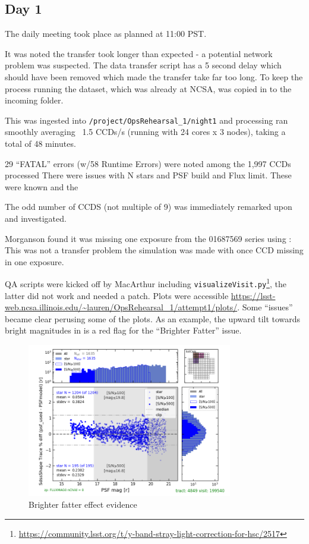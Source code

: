 \subsection{Day 1} \label{sec:day1}


The daily meeting took place as planned at 11:00 \gls{PST}.

It was noted the transfer took longer than expected - a potential network problem was suspected.
The data transfer script has a 5 second delay which should have been removed which made the transfer take far too long.
To keep the process running the dataset, which was already at \gls{NCSA}, was copied in to the incoming folder.

This was ingested into \texttt{/project/OpsRehearsal\_1/night1}  and
processing ran  smoothly  averaging  ~1.5 CCDs/s  (running with 24 cores x 3 nodes), taking a total of 48 minutes.


29 “FATAL” errors (w/58 Runtime Errors) were noted among the 1,997 CCDs processed
There were issues with N stars and \gls{PSF} build and  Flux limit. These were known and the

The odd number of CCDS (not multiple of 9) was immediately remarked upon and investigated.

Morganson found it was  missing one exposure from the 01687569 series using :
This was not a transfer problem the simulation was made with once \gls{CCD} missing in one exposure.

QA scripts were kicked off by MacArthur including \texttt{visualizeVisit.py}\footnote{\url{https://community.lsst.org/t/y-band-stray-light-correction-for-hsc/2517}}, the latter did not work and needed a \gls{patch}.
Plots were accessible \url{https://lsst-web.ncsa.illinois.edu/~lauren/OpsRehearsal_1/attempt1/plots/}.
Some “issues” became clear perusing some of the plots.  As an example, the upward tilt towards bright magnitudes in  is a red flag for the “Brighter Fatter” issue.


\begin{figure}
\includegraphics[width=0.8\textwidth]{plots/plot-v199540-psfTraceDiff-psfMagHist}
\caption{Brighter fatter effect evidence }
\label{fig:bfp}
\end{figure}



